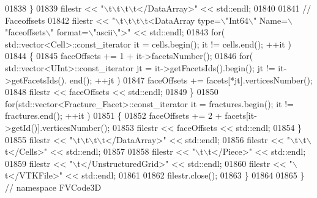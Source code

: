 \begin{DoxyCode}
01838     \}
01839     filestr << \textcolor{stringliteral}{"\(\backslash\)t\(\backslash\)t\(\backslash\)t\(\backslash\)t</DataArray>"} << std::endl;
01840 
01841     \textcolor{comment}{//  Faceoffsets}
01842     filestr << \textcolor{stringliteral}{"\(\backslash\)t\(\backslash\)t\(\backslash\)t\(\backslash\)t<DataArray type=\(\backslash\)"Int64\(\backslash\)" Name=\(\backslash\)"faceoffsets\(\backslash\)" format=\(\backslash\)"ascii\(\backslash\)">"} << std::endl;
01843     \textcolor{keywordflow}{for}( std::vector<Cell>::const\_iterator it = cells.begin(); it != cells.end(); ++it )
01844     \{
01845         faceOffsets += 1 + it->facetsNumber();
01846         \textcolor{keywordflow}{for}( std::vector<UInt>::const\_iterator jt = it->getFacetsIds().begin(); jt != it->getFacetsIds().
      end(); ++jt )
01847             faceOffsets += facets[*jt].verticesNumber();
01848         filestr << faceOffsets << std::endl;
01849     \}
01850     \textcolor{keywordflow}{for}(std::vector<Fracture\_Facet>::const\_iterator it = fractures.begin(); it != fractures.end(); ++it )
01851     \{
01852         faceOffsets += 2 + facets[it->getId()].verticesNumber();
01853         filestr << faceOffsets << std::endl;
01854     \}
01855     filestr << \textcolor{stringliteral}{"\(\backslash\)t\(\backslash\)t\(\backslash\)t\(\backslash\)t</DataArray>"} << std::endl;
01856     filestr << \textcolor{stringliteral}{"\(\backslash\)t\(\backslash\)t\(\backslash\)t</Cells>"} << std::endl;
01857 
01858     filestr << \textcolor{stringliteral}{"\(\backslash\)t\(\backslash\)t</Piece>"} << std::endl;
01859     filestr << \textcolor{stringliteral}{"\(\backslash\)t</UnstructuredGrid>"} << std::endl;
01860     filestr << \textcolor{stringliteral}{"\(\backslash\)t</VTKFile>"} << std::endl;
01861 
01862     filestr.close();
01863 \}
01864 
01865 \} \textcolor{comment}{// namespace FVCode3D}
\end{DoxyCode}
